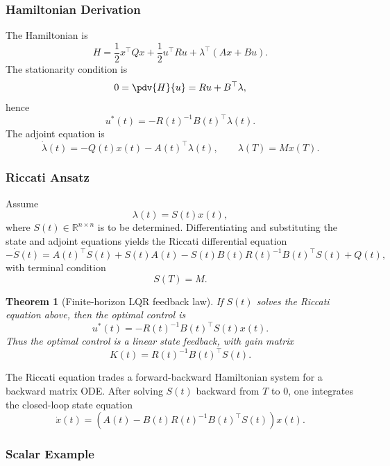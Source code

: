 \documentclass[11pt]{article}
\newtheorem{theorem}{Theorem}
\theoremstyle{definition}
\newcommand{\R}{\mathbb{R}}
\begin{document}
\subsubsection{Hamiltonian Derivation}

The Hamiltonian is
\[
H=\frac{1}{2}x^\top Qx+\frac{1}{2}u^\top Ru+\lambda^\top(Ax+Bu).
\]
The stationarity condition is
\[
0=\pdv{H}{u}=Ru+B^\top \lambda,
\]
hence
\begin{equation}
u^*(t)=-R(t)^{-1}B(t)^\top \lambda(t).
\end{equation}
The adjoint equation is
\begin{equation}
\dot{\lambda}(t)=-Q(t)x(t)-A(t)^\top \lambda(t),
\qquad
\lambda(T)=Mx(T).
\end{equation}

\subsubsection{Riccati Ansatz}

Assume
\begin{equation}
\lambda(t)=S(t)x(t),
\end{equation}
where $S(t)\in\R^{n\times n}$ is to be determined. Differentiating and substituting the state and adjoint equations yields the Riccati differential equation
\begin{equation}
-\dot{S}(t)=A(t)^\top S(t)+S(t)A(t)-S(t)B(t)R(t)^{-1}B(t)^\top S(t)+Q(t),
\end{equation}
with terminal condition
\begin{equation}
S(T)=M.
\end{equation}

\begin{theorem}[Finite-horizon LQR feedback law]
If $S(t)$ solves the Riccati equation above, then the optimal control is
\begin{equation}
u^*(t)=-R(t)^{-1}B(t)^\top S(t)x(t).
\end{equation}
Thus the optimal control is a linear state feedback, with gain matrix
\[
K(t)=R(t)^{-1}B(t)^\top S(t).
\]
\end{theorem}

The Riccati equation trades a forward-backward Hamiltonian system for a backward matrix ODE. After solving $S(t)$ backward from $T$ to $0$, one integrates the closed-loop state equation
\[
\dot{x}(t)=\left(A(t)-B(t)R(t)^{-1}B(t)^\top S(t)\right)x(t).
\]

\subsubsection{Scalar Example}
\end{document}
